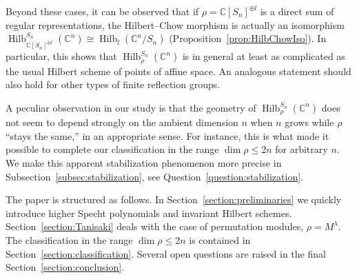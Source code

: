 \documentclass[11pt]{amsart}
\theoremstyle{definition}
\newcommand{\CC}{\mathbb{C}}
\DeclareMathOperator{\Hilb}{Hilb}
\begin{document}
Beyond these cases, it can be observed that if $\rho = \CC[S_n]^{\oplus l}$ is a direct sum of regular representations, the Hilbert--Chow morphism is actually an isomorphism $\Hilb_{\CC[S_n]^{\oplus l}}^{S_n}(\CC^n) \cong \Hilb_l(\CC^n/S_n)$ (Proposition~\ref{prop:HilbChowIso}). In particular, this shows that $\Hilb^{S_n}_\rho(\CC^n)$ is in general at least as complicated as the usual Hilbert scheme of points of affine space. An analogous statement should also hold for other types of finite reflection groups.

A peculiar observation in our study is that the geometry of $\Hilb_{\rho}^{S_{n}}(\CC^{n})$ does not seem to depend strongly on the ambient dimension $n$ when $n$ grows while $\rho$ ``stays the same,'' in an appropriate sense. For instance, this is what made it possible to complete our classification in the range $\dim \rho \leq 2n$ for arbitrary $n$. We make this apparent stabilization phenomenon more precise in Subsection~\ref{subsec:stabilization}, see Question~\ref{question:stabilization}.

The paper is structured as follows. In Section~\ref{section:preliminaries} we quickly introduce higher Specht polynomials and invariant Hilbert schemes. Section~\ref{section:Tanisaki} deals with the case of permutation modules, $\rho = M^\lambda$. The classification in the range $\dim \rho \leq 2n$ is contained in Section~\ref{section:classification}. Several open questions are raised in the final Section~\ref{section:conclusion}.



\end{document}
